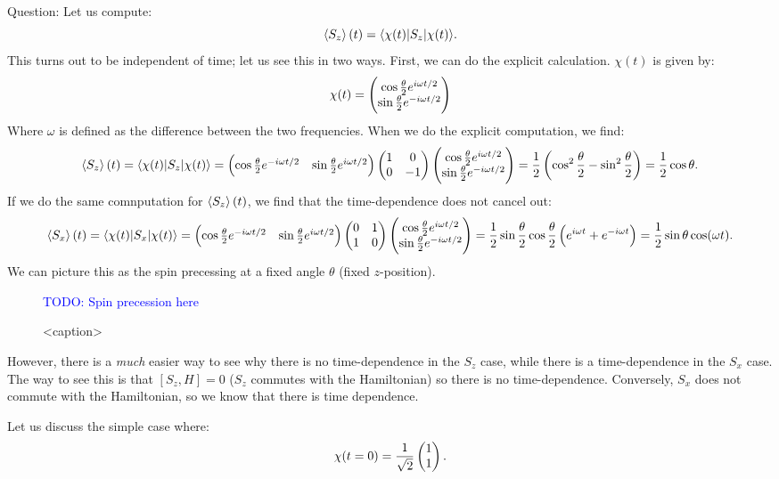 Question: Let us compute:
\begin{equation}
    \left< S_z \right>(t) = \langle \chi(t) \rvert S_z\lvert \chi(t) \rangle.
\end{equation}
This turns out to be independent of time; let us see this in two ways. First, we can do the explicit calculation. $\chi(t)$ is given by:
\begin{equation}
    \chi(t) = \begin{pmatrix}\cos\frac{\theta}{2} e^{i\omega t/2} \\ \sin\frac{\theta}{2} e^{-i\omega t/2}\end{pmatrix}
\end{equation}
Where $\omega$ is defined as the difference between the two frequencies. When we do the explicit computation, we find:
\begin{equation}
    \left< S_z \right>(t) = \langle \chi(t) \rvert S_z\lvert \chi(t) \rangle = \begin{pmatrix}\cos\frac{\theta}{2} e^{-i\omega t/2}& \sin\frac{\theta}{2} e^{i\omega t/2}\end{pmatrix}\begin{pmatrix} 1 & 0 \\ 0 & -1 \end{pmatrix} \begin{pmatrix}\cos\frac{\theta}{2} e^{i\omega t/2} \\ \sin\frac{\theta}{2} e^{-i\omega t/2}\end{pmatrix} =  \frac{1}{2}\left(\cos^2\frac{\theta}{2} - \sin^2\frac{\theta}{2}\right) = \frac{1}{2}\cos\theta.
\end{equation}
If we do the same comnputation for $\left< S_z \right>(t)$, we find that the time-dependence does not cancel out:
\begin{equation}
    \left< S_x \right>(t) = \langle \chi(t) \rvert S_x\lvert \chi(t) \rangle = \begin{pmatrix}\cos\frac{\theta}{2} e^{-i\omega t/2}& \sin\frac{\theta}{2} e^{i\omega t/2}\end{pmatrix}\begin{pmatrix} 0 & 1 \\ 1 & 0 \end{pmatrix} \begin{pmatrix}\cos\frac{\theta}{2} e^{i\omega t/2} \\ \sin\frac{\theta}{2} e^{-i\omega t/2}\end{pmatrix} =  \frac{1}{2}\sin\frac{\theta}{2}\cos\frac{\theta}{2}\left(e^{i\omega t} + e^{-i\omega t}\right) = \frac{1}{2}\sin\theta\cos(\omega t).
\end{equation}
We can picture this as the spin precessing at a fixed angle $\theta$ (fixed $z$-position).

\begin{figure}[htbp]
    \centering
    \textcolor{blue}{TODO: Spin precession here}
    \caption{<caption>}
    \label{<label>}
\end{figure}

However, there is a \emph{much} easier way to see why there is no time-dependence in the $S_z$ case, while there is a time-dependence in the $S_x$ case. The way to see this is that $[S_z, H] = 0$ ($S_z$ commutes with the Hamiltonian) so there is no time-dependence. Conversely, $S_x$ does not commute with the Hamiltonian, so we know that there is time dependence.

Let us discuss the simple case where:
\begin{equation}
    \chi(t = 0) = \frac{1}{\sqrt{2}}
    \begin{pmatrix}1\\1\end{pmatrix}.
\end{equation}

